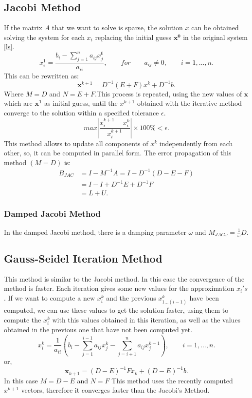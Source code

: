 \documentclass[12pt]{report}
\begin{document}
\subsection{Jacobi Method}
If the matrix \emph{A} that we want to solve is sparse, the solution $x$ can be obtained solving the system for each $x_i$
 replacing the initial guess $\mathbf{x^0}$ in the original system \eqref{ls}.
\begin{equation*}
x^1_i=\frac{b_i-\sum_{j=1}^n a_{ij}x^0_{j}}{a_{ii}},\qquad for\qquad a_{ij}\neq 0, \qquad i=1,\dots,n.
\end{equation*}
This can be rewritten as:
\begin{equation*}
\mathbf{x}^{k+1}=D^{-1}(E+F)x^k+D^{-1}b.
\end{equation*}
Where $M=D$ and $N=E+F$.This process is repeated, using the new values of $\mathbf{x}$ which are $\mathbf{x^1}$ as initial guess, until the $x^{k+1}$ obtained with
the iterative method converge to the solution within a specified tolerance $\epsilon$.
\begin{equation*}
max |\frac{x_i^{k+1}-x_i^k}{x_i^{k+1}}|\times 100 \% < \epsilon.
\end{equation*}
This method allows to update all components of $x^k$ independently from each other, so, it can be
computed in parallel form.
The error propagation of this method $(M=D)$ is:
\begin{align*}
 B_{JAC}&=I-M^{-1}A=I-D^{-1}(D-E-F)\\
 &=I-I+D^{-1}E+D^{-1}F\\
 &=L+U.
\end{align*}
\subsubsection{Damped Jacobi Method}
In the damped Jacobi method, there is a damping parameter $\omega$ and $M_{JAC\omega}=\frac{1}{\omega}D$.
\subsection{Gauss-Seidel Iteration Method}
This method is similar to the Jacobi method. In this case the convergence of the method is faster. Each iteration gives some new values for the approximation $x_i's$.
If we want to compute a new $x_i^k$ and the previous $x_{1...(i-1)}^k$ have been computed, we can use these values to get the solution faster, using them to compute the
$x_i^k$ with this values obtained in this iteration, as well as the values obtained in the previous one that have not been computed yet.
\begin{equation*}
x^k_i=\frac{1}{a_{ii}}(b_i-\sum_{j=1}^{i-1}a_{ij}x_{j}^{k}-\sum_{j=i+1}^{n}a_{ij}x_{j}^{k-1}), \qquad i=1,\dots,n.
\end{equation*}
or,
\begin{equation*}
\mathbf{x}_{k+1}=(D-E)^{-1}Fx_k+(D-E)^{-1}b.
\end{equation*}
In this case $M=D-E$ and $N=F$
This method uses the recently computed $x^{k+1}$ vectors, therefore it converges faster than the Jacobi's Method.
\end{document}
